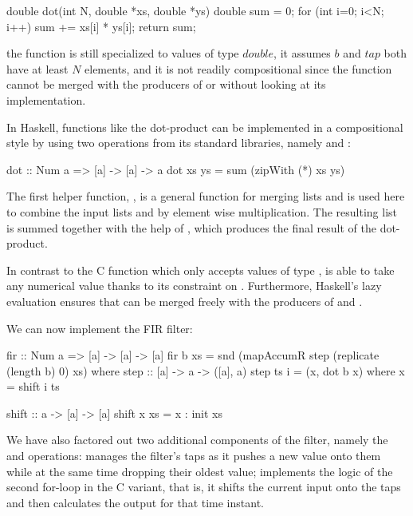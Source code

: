 \documentclass[../main.tex]{subfiles}
\begin{document}
\begin{code}
double dot(int N, double *xs, double *ys)
{
  double sum = 0;
  for (int i=0; i<N; i++) sum += xs[i] * ys[i];
  return sum;
}
\end{code}

\noindent the function is still specialized to values of type $double$, it assumes $b$ and $tap$ both have at least $N$ elements, and it is not readily compositional since the function cannot be merged with the producers of  or  without looking at its implementation.

In Haskell, functions like the dot-product can be implemented in a compositional style by using two operations from its standard libraries, namely  and :

\begin{code}
dot :: Num a => [a] -> [a] -> a
dot xs ys = sum (zipWith (*) xs ys)
\end{code}

\noindent The first helper function, , is a general function for merging lists and is used here to combine the input lists  and  by element wise multiplication. The resulting list is summed together with the help of , which produces the final result of the dot-product.

In contrast to the C function which only accepts values of type ,  is able to take any numerical value thanks to its  constraint on . Furthermore, Haskell's lazy evaluation ensures that  can be merged freely with the producers of  and .


We can now implement the FIR filter:

\begin{code}
fir :: Num a => [a] -> [a] -> [a]
fir b xs = snd (mapAccumR step (replicate (length b) 0) xs)
  where
    step :: [a] -> a -> ([a], a)
    step ts i = (x, dot b x)
      where x = shift i ts
  
    shift :: a -> [a] -> [a]
    shift x xs = x : init xs
\end{code}

\noindent We have also factored out two additional components of the filter, namely the  and  operations:  manages the filter's taps as it pushes a new value onto them while at the same time dropping their oldest value;  implements the logic of the second for-loop in the C variant, that is, it shifts the current input onto the taps and then calculates the output for that time instant.
\end{document}
